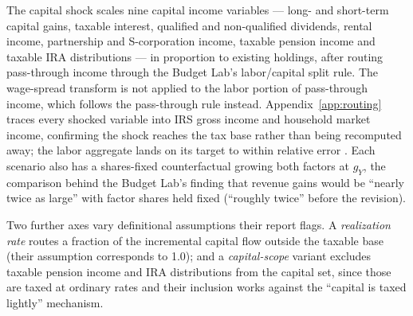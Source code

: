The capital shock scales nine capital income variables --- long- and
short-term capital gains, taxable interest, qualified and non-qualified
dividends, rental income, partnership and S-corporation income, taxable
pension income and taxable IRA distributions --- in proportion to existing
holdings, after routing pass-through income through the Budget Lab's
labor/capital split rule. The wage-spread transform is not applied to the
labor portion of pass-through income, which follows the pass-through rule
instead. Appendix~\ref{app:routing} traces every shocked
variable into IRS gross income and household market income, confirming the
shock reaches the tax base rather than being recomputed away; the labor
aggregate lands on its target to within relative error
\genLaborTargetMaxErr{}. Each scenario also has a shares-fixed
counterfactual growing both factors at $g_Y$, the comparison behind the
Budget Lab's finding that revenue gains would be ``nearly twice as large''
with factor shares held fixed (``roughly twice'' before the revision).

Two further axes vary definitional assumptions their report flags. A
\emph{realization rate} routes a fraction of the incremental capital flow
outside the taxable base (their assumption corresponds to 1.0); and a
\emph{capital-scope} variant excludes taxable pension income and IRA
distributions from the capital set, since those are taxed at ordinary rates
and their inclusion works against the ``capital is taxed lightly''
mechanism.
